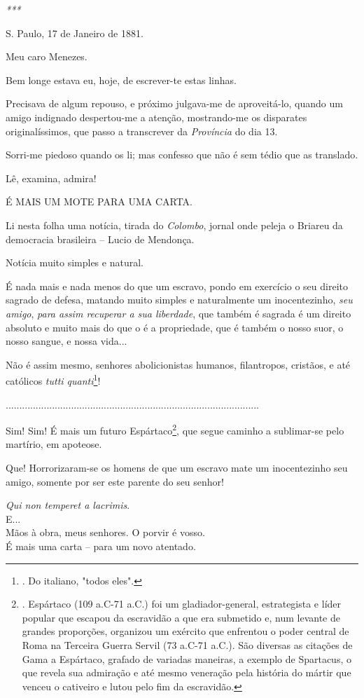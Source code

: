 \emph{***}

S. Paulo, 17 de Janeiro de 1881.

Meu caro Menezes.

Bem longe estava eu, hoje, de escrever-te estas linhas.

Precisava de algum repouso, e próximo julgava-me de aproveitá-lo, quando
um amigo indignado despertou-me a atenção, mostrando-me os disparates
originalíssimos, que passo a transcrever da \emph{Província} do dia 13.

Sorri-me piedoso quando os li; mas confesso que não é sem tédio que as
translado.

Lê, examina, admira!

É MAIS UM MOTE PARA UMA CARTA.

Li nesta folha uma notícia, tirada do \emph{Colombo}, jornal onde peleja
o Briareu da democracia brasileira -- Lucio de Mendonça.

Notícia muito simples e natural.

É nada mais e nada menos do que um escravo, pondo em exercício o seu
direito sagrado de defesa, matando muito simples e naturalmente um
inocentezinho, \emph{seu amigo}, \emph{para assim recuperar a sua
liberdade}, que também é sagrada é um direito absoluto e muito mais do
que o é a propriedade, que é também o nosso suor, o nosso sangue, e
nossa vida...

Não é assim mesmo, senhores abolicionistas humanos, filantropos,
cristãos, e até católicos \emph{tutti quanti}\footnote{. Do italiano,
  "todos eles".}!

.............................................................................................

Sim! Sim! É mais um futuro Espártaco\footnote{. Espártaco (109 a.C-71
  a.C.) foi um gladiador-general, estrategista e líder popular que
  escapou da escravidão a que era submetido e, num levante de grandes
  proporções, organizou um exército que enfrentou o poder central de
  Roma na Terceira Guerra Servil (73 a.C-71 a.C.). São diversas as
  citações de Gama a Espártaco, grafado de variadas maneiras, a exemplo
  de Spartacus, o que revela sua admiração e até mesmo veneração pela
  história do mártir que venceu o cativeiro e lutou pelo fim da
  escravidão.}, que segue caminho a sublimar-se pelo martírio, em
apoteose.

Que! Horrorizaram-se os homens de que um escravo mate um inocentezinho
seu amigo, somente por ser este parente do seu senhor!

\emph{Qui non temperet a lacrimis}.\\
E...\\
Mãos à obra, meus senhores. O porvir é vosso.\\
É mais uma carta -- para um novo atentado.

